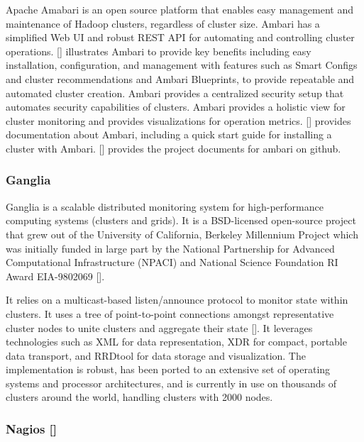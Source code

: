 Apache Amabari is an open source platform that enables easy management
and maintenance of Hadoop clusters, regardless of cluster size. Ambari
has a simplified Web UI and robust REST API for automating and
controlling cluster operations. [\cite{www-hortonworks-ambari}]
illustrates Ambari to provide key benefits including easy
installation, configuration, and management with features such as
Smart Configs and cluster recommendations and Ambari Blueprints, to
provide repeatable and automated cluster creation. Ambari provides a
centralized security setup that automates security capabilities of
clusters. Ambari provides a holistic view for cluster monitoring and
provides visualizations for operation metrics. [\cite{www-ambari}]
provides documentation about Ambari, including a quick start guide for
installing a cluster with Ambari. [\cite{www-github-ambari}] provides
the project documents for ambari on github.
     
\subsubsection{Ganglia}

Ganglia is a scalable distributed monitoring system for
high-performance computing systems (clusters and grids). It is a
BSD-licensed open-source project that grew out of the University of
California, Berkeley Millennium Project which was initially funded in
large part by the National Partnership for Advanced Computational
Infrastructure (NPACI) and National Science Foundation RI Award
EIA-9802069 [\cite{www-gms}].

It relies on a multicast-based listen/announce protocol to monitor
state within clusters. It uses a tree of point-to-point connections
amongst representative cluster nodes to unite clusters and aggregate
their state [\cite{www-gsoft}]. It leverages technologies such as XML
for data representation, XDR for compact, portable data transport, and
RRDtool for data storage and visualization. The implementation is
robust, has been ported to an extensive set of operating systems and
processor architectures, and is currently in use on thousands of
clusters around the world, handling clusters with 2000 nodes.
     
\subsubsection{Nagios [\cite{www-nagios -o-}]}

